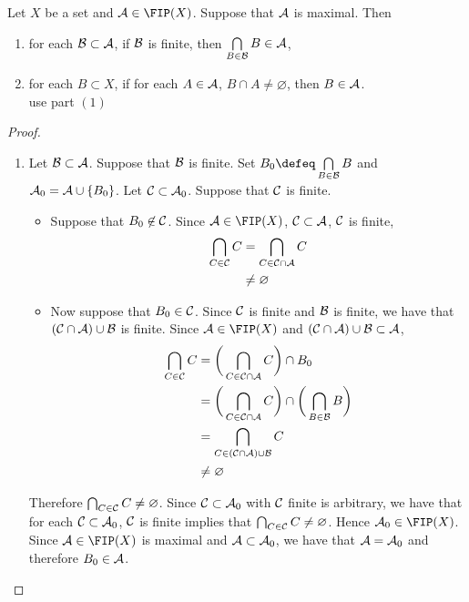 \documentclass{book}
\begin{document}
	\begin{ex}
		Let $X$ be a set and $\MA \in \FIP(X)$. Suppose that $\mathcal{A}$ is maximal. Then 
		\begin{enumerate}
			\item for each $\mathcal{B} \subset \mathcal{A}$, if $\mathcal{B}$ is finite, then $\bigcap\limits_{B \in \mathcal{B}} B \in \mathcal{A}$,
			\item for each $B \subset X$, if for each $A \in \mathcal{A}$, $B \cap A \neq \varnothing$, then $B \in \mathcal{A}$. \\
			 use part $(1)$
		\end{enumerate}
	\end{ex}

	\begin{proof}\
		\begin{enumerate}
			\item Let $\mathcal{B} \subset \mathcal{A}$. Suppose that $\mathcal{B}$ is finite. Set $B_0 \defeq \bigcap\limits_{B \in \MB} B$ and $\mathcal{A}_0 = \mathcal{A} \cup \{B_0\}$. Let $\mathcal{C} \subset \mathcal{A}_0$. Suppose that $\mathcal{C}$ is finite. 
			\begin{itemize}
				\item Suppose that $B_0 \not \in \mathcal{C}$. Since $\MA \in \FIP(X)$, $\mathcal{C} \subset \mathcal{A}$, $\mathcal{C}$ is finite,  
				\begin{align*}
					\bigcap_{C \in \mathcal{C}} C 
					& = \bigcap_{C \in \mathcal{C} \cap \mathcal{A}} C \\
					& \neq \varnothing
				\end{align*} 
				\item Now suppose that $B_0 \in \mathcal{C}$. Since $\mathcal{C}$ is finite and $\mathcal{B}$ is finite, we have that $(\mathcal{C} \cap \mathcal{A}) \cup \mathcal{B}$ is finite. Since $\MA \in \FIP(X)$ and $(\mathcal{C} \cap \mathcal{A}) \cup \mathcal{B} \subset \mathcal{A}$,  
				\begin{align*}
					\bigcap_{C \in \mathcal{C}} C 
					& = \bigg( \bigcap_{C \in \mathcal{C} \cap \mathcal{A}} C \bigg) \cap B_0  \\
					& = \bigg( \bigcap_{C \in \mathcal{C} \cap \mathcal{A}} C \bigg) \cap \bigg( \bigcap\limits_{B \in \mathcal{B}} B \bigg)  \\
					& = \bigcap_{C \in (\mathcal{C} \cap \mathcal{A}) \cup \mathcal{B}} C \\
					& \neq \varnothing
				\end{align*} 
			\end{itemize}
			Therefore $\bigcap_{C \in \mathcal{C}} C \neq \varnothing$. Since $\mathcal{C} \subset \mathcal{A}_0$ with $\mathcal{C}$ finite is arbitrary, we have that for each $\mathcal{C} \subset \mathcal{A}_0$, $\mathcal{C}$ is finite implies that $\bigcap_{C \in \mathcal{C}} C \neq \varnothing$. Hence $\MA_0 \in \FIP(X)$. Since $\MA \in \FIP(X)$ is maximal and $\mathcal{A} \subset \mathcal{A}_0$, we have that $\mathcal{A} = \mathcal{A}_0$ and therefore $B_0 \in \mathcal{A}$. 

\end{enumerate}
\end{proof}
\end{document}
